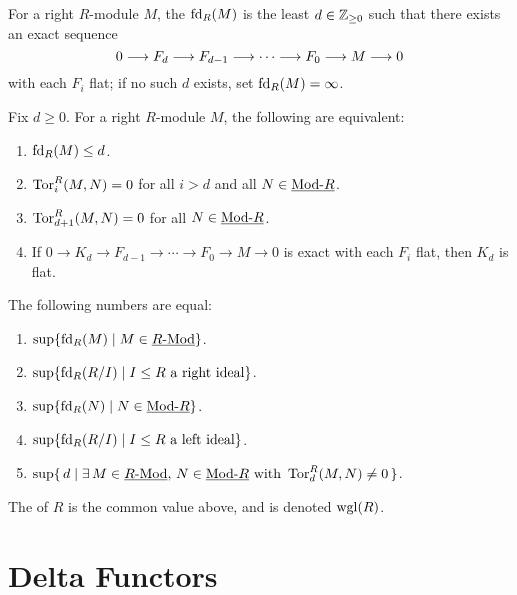 
\begin{definition*}
	For a right \( R \)-module \( M \), the  \( \operatorname{fd}_R(M) \) is the least \( d\in \mathbb{Z}_{\ge 0} \) such that there exists an exact sequence
	\[
		0\longrightarrow F_d\longrightarrow F_{d-1} \longrightarrow \dotsm \longrightarrow F_0\longrightarrow M\longrightarrow 0
	\]
	with each \( F_i \) flat; if no such \( d \) exists, set \( \operatorname{fd}_R(M)=\infty \).
\end{definition*}

\begin{lemma*}
	Fix \( d \ge 0 \). For a right \( R \)-module \( M \), the following are equivalent:
	\begin{enumerate}
		\item \( \operatorname{fd}_R(M) \le d \).
		\item \( \operatorname{Tor}^R_i(M,N)=0 \) for all \( i>d \) and all \( N\in \underline{\mathrm{Mod}\text{-}R} \).
		\item \( \operatorname{Tor}^R_{d+1}(M,N)=0 \) for all \( N\in \underline{\mathrm{Mod}\text{-}R} \).
		\item If \( 0\to K_d\to F_{d-1}\to \dotsm \to F_0\to M\to 0 \) is exact with each \( F_i \) flat, then \( K_d \) is flat.
	\end{enumerate}
\end{lemma*}

\begin{theorem*}
	The following numbers are equal:
	\begin{enumerate}
		\item \( \displaystyle \sup\{\operatorname{fd}_R(M)\mid M\in \underline{R\text{-}\mathrm{Mod}}\} \).
		\item \( \displaystyle \sup\{\operatorname{fd}_R(R/I)\mid I\le R \text{ a right ideal}\} \).
		\item \( \displaystyle \sup\{\operatorname{fd}_R(N)\mid N\in \underline{\mathrm{Mod}\text{-}R}\} \).
		\item \( \displaystyle \sup\{\operatorname{fd}_R(R/I)\mid I\le R \text{ a left ideal}\} \).
		\item \( \displaystyle \sup\{\,d \mid \exists\, M\in \underline{R\text{-}\mathrm{Mod}},\,N\in \underline{\mathrm{Mod}\text{-}R}\text{ with }\operatorname{Tor}^R_d(M,N)\neq 0\,\} \).
	\end{enumerate}
\end{theorem*}

\begin{definition*}
	The  of \( R \) is the common value above, and is denoted \( \operatorname{wgl}(R) \).
\end{definition*}

\chapter{Delta Functors}

